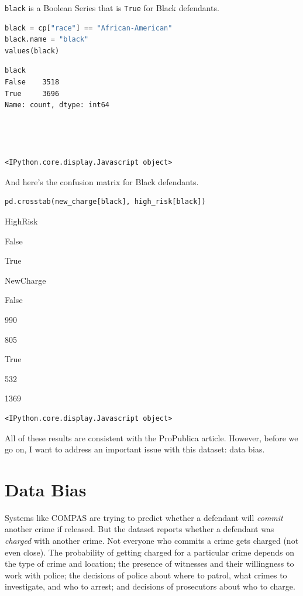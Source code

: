 \passthrough{\lstinline!black!} is a Boolean Series that is
\passthrough{\lstinline!True!} for Black defendants.

\begin{lstlisting}[language=Python,style=source]
black = cp["race"] == "African-American"
black.name = "black"
values(black)
\end{lstlisting}

\begin{lstlisting}[style=output]
black
False    3518
True     3696
Name: count, dtype: int64




<IPython.core.display.Javascript object>
\end{lstlisting}

And here's the confusion matrix for Black defendants.

\begin{lstlisting}[language=Python,style=source]
pd.crosstab(new_charge[black], high_risk[black])
\end{lstlisting}

HighRisk

False

True

NewCharge

False

990

805

True

532

1369

\begin{lstlisting}[style=output]
<IPython.core.display.Javascript object>
\end{lstlisting}

All of these results are consistent with the ProPublica article.
However, before we go on, I want to address an important issue with this
dataset: data bias.

\hypertarget{data-bias}{%
\section{Data Bias}\label{data-bias}}

Systems like COMPAS are trying to predict whether a defendant will
\emph{commit} another crime if released. But the dataset reports whether
a defendant was \emph{charged} with another crime. Not everyone who
commits a crime gets charged (not even close). The probability of
getting charged for a particular crime depends on the type of crime and
location; the presence of witnesses and their willingness to work with
police; the decisions of police about where to patrol, what crimes to
investigate, and who to arrest; and decisions of prosecutors about who
to charge.

